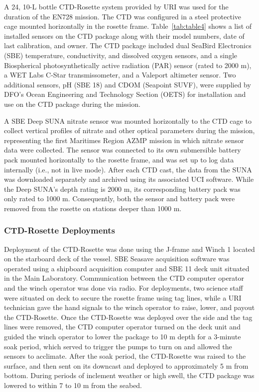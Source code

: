 \documentclass[12pt]{article}\usepackage[]{graphicx}\usepackage[]{color}
\begin{document}
A 24, 10-L bottle CTD-Rosette system provided by URI was used for the duration of the EN728 mission. The CTD was configured in a steel protective cage mounted horizontally in the rosette frame. Table~\ref{tab:table4} shows a list of installed sensors on the CTD package along with their model numbers, date of last calibration, and owner. The CTD package included dual SeaBird Electronics (SBE) temperature, conductivity, and dissolved oxygen sensors, and a single Biospherical photosynthetically active radiation (PAR) sensor (rated to 2000 m), a WET Labs C-Star transmissometer, and a Valeport altimeter sensor. Two additional sensors, pH (SBE 18) and CDOM (Seapoint SUVF), were supplied by DFO's Ocean Engineering and Technology Section (OETS) for installation and use on the CTD package during the mission.

A SBE Deep SUNA nitrate sensor was mounted horizontally to the CTD cage to collect vertical profiles of nitrate and other optical parameters during the mission, representing the first Maritimes Region AZMP mission in which nitrate sensor data were collected. The sensor was connected to its own submersible battery pack mounted horizontally to the rosette frame, and was set up to log data internally (i.e., not in live mode). After each CTD cast, the data from the SUNA was downloaded separately and archived using its associated UCI software. While the Deep SUNA's depth rating is 2000 m, its corresponding battery pack was only rated to 1000 m. Consequently, both the sensor and battery pack were removed from the rosette on stations deeper than 1000 m.

\subsubsection{CTD-Rosette Deployments}\label{ctd-rosette-deployments}

Deployment of the CTD-Rosette was done using the J-frame and Winch 1 located on the starboard deck of the vessel. SBE Seasave acquisition software was operated using a shipboard acquisition computer and SBE 11 deck unit situated in the Main Laboratory. Communication between the CTD computer operator and the winch operator was done via radio. For deployments, two science staff were situated on deck to secure the rosette frame using tag lines, while a URI technician gave the hand signals to the winch operator to raise, lower, and payout the CTD-Rosette. Once the CTD-Rosette was deployed over the side and the tag lines were removed, the CTD computer operator turned on the deck unit and guided the winch operator to lower the package to 10 m depth for a 3-minute soak period, which served to trigger the pumps to turn on and allowed the sensors to acclimate. After the soak period, the CTD-Rosette was raised to the surface, and then sent on its downcast and deployed to approximately 5 m from bottom. During periods of inclement weather or high swell, the CTD package was lowered to within 7 to 10 m from the seabed.
\end{document}
